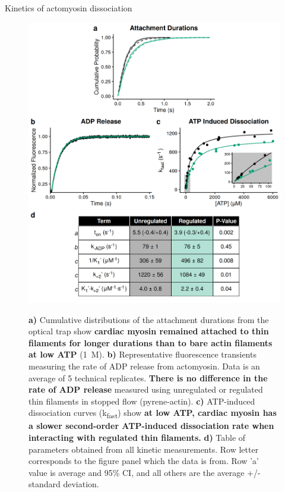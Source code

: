 \documentclass[final]{beamer}
\newlength{\colwidth}
\begin{document}
\begin{frame}[t]
\begin{columns}[t]
\begin{column}{\colwidth}
\begin{block}{Kinetics of actomyosin dissociation}
    \begin{minipage}{0.58 \textwidth}
      \begin{figure}
        \includegraphics[scale=1.3]{figure-3_kinetics}
        \end{figure}
    \end{minipage}
    \begin{minipage}{0.38 \textwidth}
      \begin{figure}
        \caption{\textbf{a)} Cumulative distributions of the attachment durations from the optical trap show \textbf{cardiac myosin remained attached to thin filaments for longer durations than to bare actin filaments at low ATP} (1~{\textmu}M). \textbf{b)} Representative fluorescence transients measuring the rate of ADP release from actomyosin. Data is an average of 5 technical replicates. \textbf{There is no difference in the rate of ADP release} measured using unregulated or regulated thin filaments in stopped flow (pyrene-actin). \textbf{c)} ATP-induced dissociation curves (k\textsubscript{fast}) show \textbf{at low ATP, cardiac myosin has a slower second-order ATP-induced dissociation rate when interacting with regulated thin filaments.} \textbf{d)} Table of parameters obtained from all kinetic measurements. Row letter corresponds to the figure panel which the data is from. Row 'a' value is average and 95\% CI, and all others are the average +/- standard deviation.}
        \end{figure}
    \end{minipage}
  \end{block}


\end{column}
\end{columns}
\end{frame}
\end{document}
